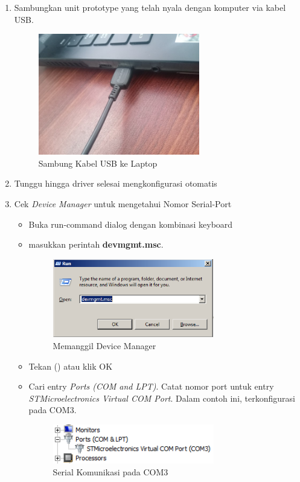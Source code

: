 \documentclass{article}
\begin{document}
\begin{enumerate}
		\item Sambungkan unit prototype yang telah nyala dengan komputer via kabel USB.
		\begin{figure}[H]
			\centering
			\includegraphics[width=200pt]{images/pasang/laptop_usb}
			\caption{Sambung Kabel USB ke Laptop}
		\end{figure}
		
		\item Tunggu hingga driver selesai mengkonfigurasi otomatis
		
		\item Cek \textit{Device Manager} untuk mengetahui Nomor Serial-Port
		\begin{itemize}
			\item Buka run-command dialog dengan kombinasi keyboard %
			
			\item masukkan perintah \textbf{devmgmt.msc}.
			\begin{figure}[H]
				\centering
				\includegraphics[width=200pt]{images/software/devicemgr}
				\caption{Memanggil Device Manager}
			\end{figure}
			
			\item Tekan (\keys{\return}) atau klik OK
			
			\item Cari entry \textit{Ports (COM and LPT)}.
			Catat nomor port untuk entry \textit{STMicroelectronics Virtual COM Port}.
			Dalam contoh ini, terkonfigurasi pada COM3.
			
			\begin{figure}[H]
				\centering
				\includegraphics[width=200pt]{images/software/comport}
				\caption{Serial Komunikasi pada COM3}
			\end{figure}
		\end{itemize}
		

\end{enumerate}
\end{document}
